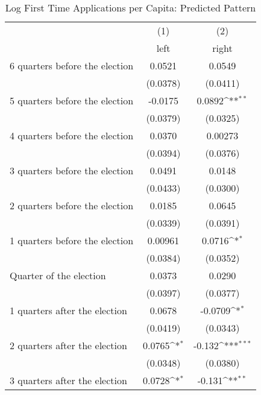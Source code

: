 \begin{table}[htbp]\centering
\def\sym#1{\ifmmode^{#1}\else\(^{#1}\)\fi}
\caption{Log First Time Applications per Capita: Predicted Pattern}
\begin{tabular}{l*{2}{c}}
\hline\hline
                    &\multicolumn{1}{c}{(1)}&\multicolumn{1}{c}{(2)}\\
                    &\multicolumn{1}{c}{left}&\multicolumn{1}{c}{right}\\
\hline
 6 quarters before the election&      0.0521         &      0.0549         \\
                    &    (0.0378)         &    (0.0411)         \\
[1em]
 5 quarters before the election&     -0.0175         &      0.0892\sym{**} \\
                    &    (0.0379)         &    (0.0325)         \\
[1em]
 4 quarters before the election&      0.0370         &     0.00273         \\
                    &    (0.0394)         &    (0.0376)         \\
[1em]
 3 quarters before the election&      0.0491         &      0.0148         \\
                    &    (0.0433)         &    (0.0300)         \\
[1em]
 2 quarters before the election&      0.0185         &      0.0645         \\
                    &    (0.0339)         &    (0.0391)         \\
[1em]
 1 quarters before the election&     0.00961         &      0.0716\sym{*}  \\
                    &    (0.0384)         &    (0.0352)         \\
[1em]
Quarter of the election&      0.0373         &      0.0290         \\
                    &    (0.0397)         &    (0.0377)         \\
[1em]
 1 quarters after the election&      0.0678         &     -0.0709\sym{*}  \\
                    &    (0.0419)         &    (0.0343)         \\
[1em]
 2 quarters after the election&      0.0765\sym{*}  &      -0.132\sym{***}\\
                    &    (0.0348)         &    (0.0380)         \\
[1em]
 3 quarters after the election&      0.0728\sym{*}  &      -0.131\sym{**} \\

\end{tabular}
\end{table}
